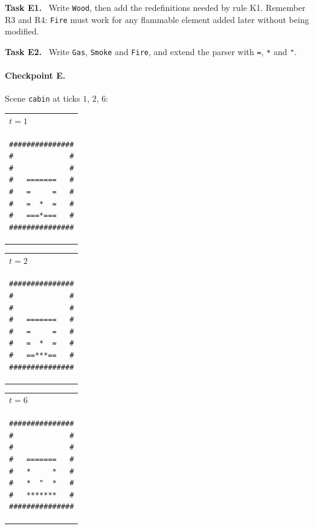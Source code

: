 \documentclass[11pt,a4paper]{article}
\makeatletter
\newcommand{\code}[1]{\texttt{#1}}
\newenvironment{checkpoint}[1]
  {\begin{tabular}[t]{@{}l@{}}\footnotesize #1\\[2pt]}
  {\end{tabular}}
\newcommand{\task}[1]{\par\medskip\textbf{Task #1.}\ }
\makeatother
\begin{document}
\task{E1} Write \code{Wood}, then add the redefinitions needed by rule K1. Remember R3 and R4:
\code{Fire} must work for any flammable element added later without being modified.

\task{E2} Write \code{Gas}, \code{Smoke} and \code{Fire}, and extend the parser with
\verb|=|, \verb|*| and \verb|"|.

\paragraph{Checkpoint E.} Scene \code{cabin} at ticks \(1\), \(2\), \(6\):
\begin{center}
\begin{checkpoint}{$t=1$}
\begin{BVerbatim}
###############
#             #
#             #
#   =======   #
#   =     =   #
#   =  *  =   #
#   ===*===   #
###############
\end{BVerbatim}
\end{checkpoint}
\hspace{1.6em}
\begin{checkpoint}{$t=2$}
\begin{BVerbatim}
###############
#             #
#             #
#   =======   #
#   =     =   #
#   =  *  =   #
#   ==***==   #
###############
\end{BVerbatim}
\end{checkpoint}
\hspace{1.6em}
\begin{checkpoint}{$t=6$}
\begin{BVerbatim}
###############
#             #
#             #
#   =======   #
#   *     *   #
#   *  "  *   #
#   *******   #
###############
\end{BVerbatim}
\end{checkpoint}
\end{center}
\end{document}
